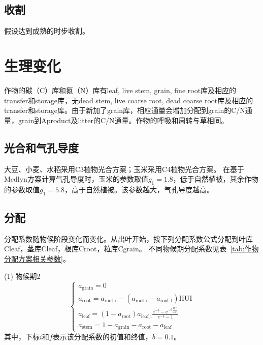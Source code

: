 \subsection{收割}
假设达到成熟的时步收割。


\section{生理变化}
作物的碳（C）库和氮（N）库有leaf, live stem, grain, fine root库及相应的transfer和storage库，无dead stem, live coarse root, dead coarse root库及相应的transfer和storage库。由于新加了grain库，相应通量会增加分配到grain的C/N通量，grain到Aproduct及litter的C/N通量。作物的呼吸和周转与草相同。

\subsection{光合和气孔导度}
大豆、小麦、水稻采用C3植物光合方案；玉米采用C4植物光合方案。
在基于Medlyn方案计算气孔导度时，玉米的参数取值$g_1=1.8$，低于自然植被，其余作物的参数取值$g_1=5.8$，高于自然植被。该参数越大，气孔导度越高。

\subsection{分配}
分配系数随物候阶段变化而变化。从出叶开始，按下列分配系数公式分配到叶库Cleaf，茎库Cleaf，根库Croot，粒库Cgrain。
不同物候期分配系数见表~\ref{tab:作物分配方案相关参数}。

(1)	物候期2 \\
\begin{equation}
  \left\{\begin{array}{c}
      a_{\mathrm{grain}}=0 \\
      a_{\mathrm{root}}=a_{\mathrm{root\_i}}-\left(a_{\mathrm{root\_i}}-a_{\mathrm{root\_f}}\right) {\mathrm {HUI}} \\
      a_{\mathrm{leaf}}=\left(1-a_{\mathrm{root}}\right) a_{\mathrm{leaf\_i}} \frac{{e}^{-{b}}-{e}^{-b \frac{{\mathrm {HUI}}}{f_{\mathrm{GF}}}}}{{e}^{-{b}}-1}   \\
      a_{\mathrm{stem}}=1-a_{\mathrm{grain}}-a_{\mathrm{root}}-a_{\mathrm{leaf}}
  \end{array}\right.
\end{equation}
其中，下标$i$和$f$表示该分配系数的初值和终值，$b=0.1$。

